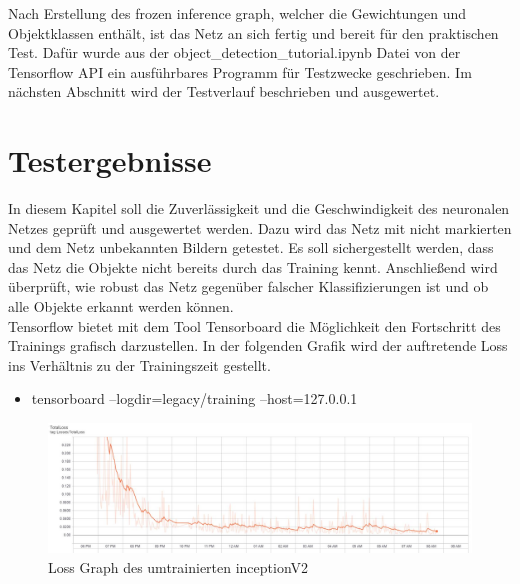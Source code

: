 \documentclass[a4paper,12pt,oneside]{article}
\begin{document}
Nach Erstellung des \glqq frozen inference graph\grqq, welcher die Gewichtungen und Objektklassen enthält, ist das Netz an sich fertig und bereit für den praktischen Test. Dafür wurde aus der object\_detection\_tutorial.ipynb Datei von der Tensorflow API ein ausführbares Programm für Testzwecke geschrieben. Im nächsten Abschnitt wird der Testverlauf beschrieben und ausgewertet.
  
\newpage

\section{Testergebnisse}
In diesem Kapitel soll die Zuverlässigkeit und die Geschwindigkeit des neuronalen Netzes geprüft und ausgewertet werden. Dazu wird das Netz mit nicht markierten und dem Netz unbekannten Bildern getestet. Es soll sichergestellt werden, dass das Netz die Objekte nicht bereits durch das Training kennt. Anschließend wird überprüft, wie robust das Netz gegenüber falscher Klassifizierungen ist und ob alle Objekte erkannt werden können. 
\\
Tensorflow bietet mit dem Tool Tensorboard die Möglichkeit den Fortschritt des Trainings grafisch darzustellen. In der folgenden Grafik wird der auftretende \glqq Loss \glqq ins Verhältnis zu der Trainingszeit gestellt. 
\\
 \begin{itemize}
\item tensorboard --logdir=legacy/training --host=127.0.0.1
  \end{itemize}
  
\begin{figure}
    [h]
	\centering
	\includegraphics[scale=0.4]{Sources/loss_graph_200000.jpg}
	\caption{Loss Graph des umtrainierten inceptionV2}
	\label{img:loss_graph_200000}
\end{figure}
\end{document}
